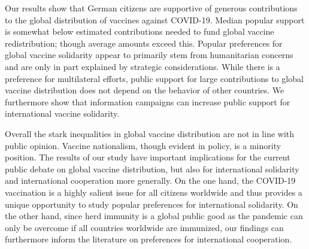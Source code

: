 \documentclass[12pt,oneside]{article}
\begin{document}




Our results show that  German citizens are supportive of generous contributions to the global distribution of vaccines against COVID-19. Median popular support is somewhat below estimated contributions needed to fund global vaccine redistribution; though average amounts exceed this. Popular preferences for global vaccine solidarity  appear to primarily stem from humanitarian concerns and are only in part explained by strategic considerations. While there is a preference for multilateral efforts, public support for large contributions to global vaccine distribution does not depend  on the behavior of other countries. We furthermore show that information campaigns can increase public support for international vaccine solidarity. 




Overall the stark inequalities in global vaccine distribution are not in line with public opinion. Vaccine nationalism, though evident in policy, is a minority position. The results of our study have important implications for the current public debate on global vaccine distribution, but also for international solidarity and international cooperation more generally. On the one hand, the COVID-19 vaccination is a highly salient issue for all citizens worldwide and thus provides a unique opportunity to study popular preferences for international solidarity. On the other hand, since herd immunity is a global public good as the pandemic can only be overcome if all countries worldwide are immunized, our findings can furthermore inform the literature on preferences for international cooperation. 
\end{document}
